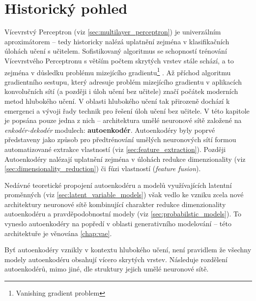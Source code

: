 \section{Historický pohled}
Vícevrstvý Perceptron (viz \autoref{sec:multilayer_perceptron})
je univerzálním aproximátorem – tedy historicky nalézá uplatnění zejména v klasifikačních úlohách učení s učitelem.
Sofistikovaný algoritmus se schopností trénování Vícevrstvého Perceptronu s větším počtem skrytých vrstev stále schází, a to zejména v důsledku problému mizejícího gradientu\footnote{Vanishing gradient problem} \cite{Hochreiter1998}.
Až příchod algoritmu gradientního sestupu, který adresuje problém mizejícího gradientu v aplikacích konvolučních sítí \cite{LeCun1989} (a později i úloh učení bez učitele) značí počátek moderních metod hlubokého učení.
V oblasti hlubokého učení tak přirozeně dochází k emergenci a vývoji řady technik pro řešení úloh učení bez učitele.
V této kapitole je popsána pouze jedna z nich – architektura umělé neuronové sítě založené na \emph{enkodér-dekodér} modulech: \textbf{autoenkodér}.
Autoenkodéry byly poprvé představeny jako způsob pro předtrénování umělých neuronových sítí formou automatizované extrakce vlastností (viz \autoref{sec:feature_extraction}). 
Později Autoenkodéry nalézají uplatnění zejména v úlohách redukce dimenzionality (viz \autoref{sec:dimensionality_reduction}) či fůzi vlastností (\emph{feature fusion}). \cite{Charte2018}


Nedávné teoretické propojení autoenkodéru a modelů využívajících latentní proměnných (viz \autoref{sec:latent_variable_models}) však vedlo ke vzniku zcela nové architektury neuronové sítě kombinující charakter redukce dimenzionality autoenkodéru a pravděpodobnostní modely (viz \autoref{sec:probabilstic_models}).
To vyneslo autoenkodéry na popředí v oblasti generativního modelování – této architektuře je věnována \autoref{chap:vae}.

Byť autoenkodéry vznikly v kontextu hlubokého učení, není pravidlem že všechny modely autoenkodéru obsahují vícero skrytých vrstev. Následuje rozdělení autoenkodérů, mimo jiné, dle struktury jejich umělé neuronové sítě.
